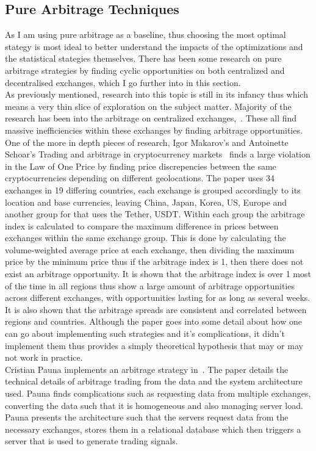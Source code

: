 \subsection{Pure Arbitrage Techniques}
As I am using pure arbitrage as a baseline, thus choosing the most optimal stategy is most ideal to better understand the impacts of the optimizations and the statistical stategies themselves. There has been some research on pure arbitrage strategies by finding cyclic opportunities on both centralized and decentralised exchanges, which I go further into in this section.
\\[5mm]
As previously mentioned, research into this topic is still in its infancy thus which means a very thin slice of exploration on the subject matter. Majority of the research has been into the arbitrage on centralized exchanges,~\cite{MakarovIgor2020Taai, crepelliere_arbitrage_2022, PAUNACristian2018ATSf}. These all find massive inefficiencies within these exchanges by finding arbitrage opportunities. One of the more in depth pieces of research, Igor Makarov's and Antoinette Schoar's Trading and arbitrage in cryptocurrency markets~\cite{MakarovIgor2020Taai} finds a large violation in the Law of One Price by finding price discrepencies between the same cryptocurrencies depending on different geolocations. The paper uses 34 exchanges in 19 differing countries, each exchange is grouped accordingly to its location and base currencies, leaving China, Japan, Korea, US, Europe and another group for that uses the Tether, USDT. Within each group the arbitrage index is calculated to compare the maximum difference in prices between exchanges within the same exchange group. This is done by calculating the volume-weighted average price at each exchange, then dividing the maximum price by the minimum price thus if the arbitrage index is 1, then there does not exist an arbitrage opportunity. It is shown that the arbitrage index is over 1 most of the time in all regions thus show a large amount of arbitrage opportunities across different exchanges, with opportunities lasting for as long as several weeks. It is also shown that the arbitrage spreads are consistent and correlated between regions and countries. Although the paper goes into some detail about how one can go about implementing such strategies and it's complications, it didn't implement them thus provides a simply theoretical hypothesis that may or may not work in practice.
\\[5mm]
Cristian Pauna implements an arbitrage strategy in~\cite{PAUNACristian2018ATSf}. The paper details the technical details of arbitrage trading from the data and the system architecture used. Pauna finds complications such as requesting data from multiple exchanges, converting the data such that it is homogeneous and also managing server load. Pauna presents the architecture such that the servers request data from the necessary exchanges, stores them in a relational database which then triggers a server that is used to generate trading signals.

